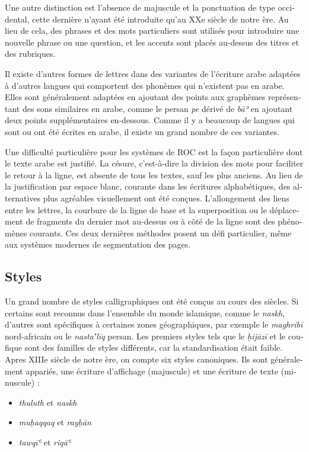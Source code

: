 \begin{french}
Une autre distinction est l'absence de majuscule et la ponctuation de type
occidental, cette dernière n'ayant été introduite qu'au XXe siècle de notre
ère. Au lieu de cela, des phrases et des mots particuliers sont utilisés pour
introduire une nouvelle phrase ou une question, et les accents sont placés au-dessus
des titres et des rubriques.

Il existe d'autres formes de lettres dans des variantes de l'écriture arabe
adaptées à d'autres langues qui comportent des phonèmes qui n'existent pas
en arabe. Elles sont généralement adaptées en ajoutant des points aux graphèmes
représentant des sons similaires en arabe, comme le persan \emph{pe} dérivé de
\emph{bāʾ} en ajoutant deux points supplémentaires en-dessous. Comme il y a
beaucoup de langues qui sont ou ont été écrites en arabe, il existe un
grand nombre de ces variantes.

Une difficulté particulière pour les systèmes de ROC est la façon particulière
dont le texte arabe est justifié. La césure, c'est-à-dire la division des mots
pour faciliter le retour à la ligne, est absente de tous les textes, sauf les
plus anciens. Au lieu de la justification par espace blanc, courante dans les
écritures alphabétiques, des alternatives plus agréables visuellement ont été
conçues. L'allongement des liens entre les lettres, la courbure de la ligne de
base et la superposition ou le déplacement de fragments du dernier mot
au-dessus ou à côté de la ligne sont des phénomènes courants. Ces deux
dernières méthodes posent un défi particulier, même aux systèmes modernes de
segmentation des pages.

\subsection{Styles}

Un grand nombre de styles calligraphiques ont été conçus au cours des siècles.
Si certains sont reconnus dans l'ensemble du monde islamique, comme le
\emph{naskh}, d'autres sont spécifiques à certaines zones géographiques, par
exemple le \emph{maghribī} nord-africain ou le \emph{nastaʼlīq} persan. Les
premiers styles tels que le \emph{ḥijāzī} et le coufique sont des familles de
styles différents, car la standardisation était faible. Apres XIIIe siècle de
notre ère, on compte six styles canoniques. Ils sont généralement
appariés, une écriture d'affichage (majuscule) et une écriture de texte
(minuscule) :

\begin{itemize}
        \item \emph{thuluth} et \emph{naskh}
        \item \emph{muḥaqqaq} et \emph{rayḥān}
        \item \emph{tawqīʿ} et \emph{riqāʿ}
\end{itemize}


\end{french}

